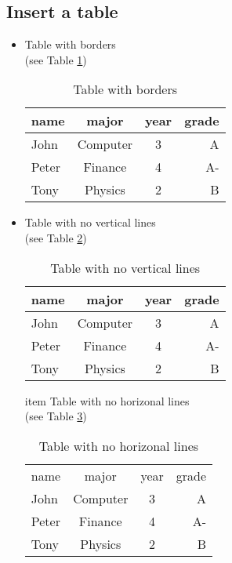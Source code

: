 \documentclass{article}
\begin{document}
\subsection{Insert a table}
\begin{itemize}
\item Table with borders\\
(see Table \ref{TableHV})

\begin{table}[h]
\centering
 \begin{tabular}{|l|c|c|r|}
 \hline
 name & major & year & grade \\
 \hline
 John & Computer & 3 & A \\
 \hline
 Peter & Finance & 4 & A- \\
 \hline
 Tony & Physics & 2 & B \\
 \hline
 \end{tabular}
\caption{Table with borders}
\label{TableHV}
\end{table}
\item Table with no vertical lines\\
(see Table \ref{TableH})

\begin{table}[h]
 \centering
 \begin{tabular}{lccr}
 \hline
 name & major & year & grade \\
 \hline
 John & Computer & 3 & A \\
 \hline
 Peter & Finance & 4 & A- \\
 \hline
 Tony & Physics & 2 & B \\
 \hline
 \end{tabular}
\caption{Table with no vertical lines}
\label{TableH}
\end{table}

item Table with no horizonal lines\\
(see Table \ref{TableV})

\begin{table}[h]
 \centering
 \begin{tabular}{|l|c|c|r|}
 name & major & year & grade \\
 John & Computer & 3 & A \\
 Peter & Finance & 4 & A- \\
 Tony & Physics & 2 & B \\
 \end{tabular}
\caption{Table with no horizonal lines}
\label{TableV}
\end{table}\


\end{itemize}
\end{document}
